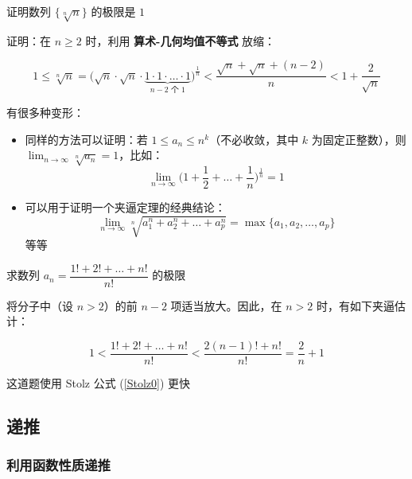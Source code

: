 \begin{exercise}[适当拆分构造均值不等式]

证明数列 $\displaystyle \lbrace \sqrt[n]{n} \rbrace$ 的极限是 $1$

证明：在 $\displaystyle n \ge 2$ 时，利用 \textbf{算术-几何均值不等式} 放缩：

$$
\displaystyle 1 \le \sqrt[n]{n} = \Big( \sqrt{n} \cdot \sqrt{n} \cdot \underbrace{1 \cdot 1 \cdot \dots \cdot 1}_{n-2 \text{ 个 } 1} \Big)^{\frac{1}{n}} < \dfrac{\sqrt{n} + \sqrt{n} + (n-2)}{n} < 1 + \dfrac{2}{\sqrt{n}}
$$

\end{exercise}

有很多种变形：

\begin{itemize}
  \item {同样的方法可以证明：若 $\displaystyle 1 \le a_n \le n^k$（不必收敛，其中 $\displaystyle k$ 为固定正整数），则 $\displaystyle \lim_{n \to \infty} \sqrt[n]{a_n} = 1$，比如：$$
\displaystyle\lim_{n \to \infty} \Big( 1 + \dfrac{1}{2} + \dots + \dfrac{1}{n} \Big)^{\frac{1}{n}}= 1$$
}\item {可以用于证明一个夹逼定理的经典结论：$$
\displaystyle \lim_{n \to \infty} \sqrt[n]{a_1^n + a_2^n + \dots + a_p^n} = \max \lbrace a_1, a_2, \dots, a_p \rbrace$$
等等}
\end{itemize}

\begin{exercise}[（P35，例题）数量级较小的项目放大成次小项]

求数列 $\displaystyle a_n = \dfrac{1! + 2! + \dots + n!}{n!}$ 的极限

\end{exercise}

将分子中（设 $\displaystyle n > 2$）的前 $\displaystyle n-2$ 项适当放大。因此，在 $\displaystyle n > 2$ 时，有如下夹逼估计：

$$
\displaystyle 1 < \dfrac{1! + 2! + \dots + n!}{n!} < \dfrac{2(n-1)! + n!}{n!} = \dfrac{2}{n} + 1
$$

这道题使用 Stolz 公式 (\ref{Stolz0}) 更快

\subsection{递推}

\subsubsection{利用函数性质递推}

